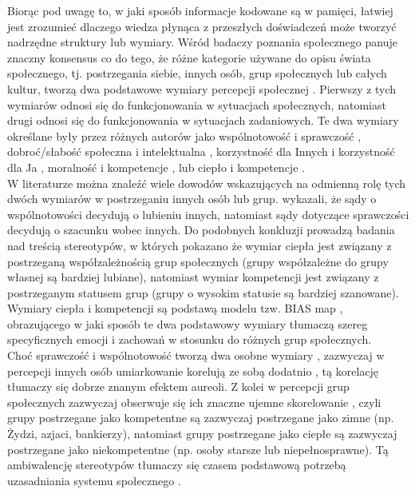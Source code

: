 \documentclass[man]{apa6}
\begin{document}
Biorąc pod uwagę to, w jaki sposób informacje kodowane są w pamięci, łatwiej jest zrozumieć dlaczego wiedza płynąca z przeszłych doświadczeń może tworzyć nadrzędne struktury lub wymiary. Wśród badaczy poznania społecznego panuje znaczny konsensus co do tego, że różne kategorie używane do opisu świata społecznego, tj. postrzegania siebie, innych osób, grup społecznych lub całych kultur, tworzą dwa podstawowe wymiary percepcji społecznej \parencite{fiske2007universal, judd2005fundamental}. Pierwszy z tych wymiarów odnosi się do funkcjonowania w sytuacjach społecznych, natomiast drugi odnosi się do funkcjonowania w sytuacjach zadaniowych. Te dwa wymiary określane były przez różnych autorów jako wspólnotowość i sprawczość \parencite{abele2007agency}, dobroć/słabość społeczna i intelektualna \parencite {rosenberg1968multidimensional}, korzystność dla Innych i korzystność dla Ja \parencite{peeters1992evaluative}, moralność i kompetencje \parencite{wojciszke2005morality}, lub ciepło i kompetencje \parencite{fiske2002model}.\\

W literaturze można znaleźć wiele dowodów wskazujących na odmienną rolę tych dwóch wymiarów w postrzeganiu innych osób lub grup. \textcite{wojciszke2009two} wykazali, że sądy o wspólnotowości decydują o lubieniu innych, natomiast sądy dotyczące sprawczości decydują o szacunku wobec innych. Do podobnych konkluzji prowadzą badania \textcite{fiske1999dis} nad treścią stereotypów, w których pokazano że wymiar ciepła jest związany z postrzeganą współzależnością grup społecznych (grupy współzależne do grupy własnej są bardziej lubiane), natomiast wymiar kompetencji jest związany z postrzeganym statusem grup (grupy o wysokim statusie są bardziej szanowane). Wymiary ciepła i kompetencji są podstawą modelu tzw. BIAS map \parencite{cuddy2007bias}, obrazującego w jaki sposób te dwa podstawowy wymiary tłumaczą szereg specyficznych emocji i zachowań w stosunku do różnych grup społecznych.\\

Choć sprawczość i wspólnotowość tworzą dwa osobne wymiary \parencite{rosenberg1968multidimensional}, zazwyczaj w percepcji innych osób umiarkowanie korelują ze sobą dodatnio \parencite{judd2005fundamental}, tą korelację tłumaczy się dobrze znanym efektem aureoli. Z kolei w percepcji grup społecznych zazwyczaj obserwuje się ich znaczne ujemne skorelowanie \parencite{fiske1999dis}, czyli grupy postrzegane jako kompetentne są zazwyczaj postrzegane jako zimne (np. Żydzi, azjaci, bankierzy), natomiast grupy postrzegane jako ciepłe są zazwyczaj postrzegane jako niekompetentne (np. osoby starsze lub niepełnosprawne). Tą ambiwalencję stereotypów tłumaczy się czasem podstawową potrzebą uzasadniania systemu społecznego \parencite[patrz,][]{kay2003complementary}.\\
\end{document}
